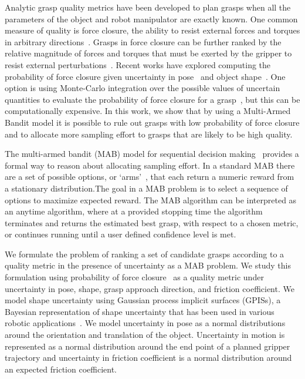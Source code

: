 \documentclass[a4paper, 10pt, conference]{ieeeconf}      %
\begin{document}
Analytic grasp quality metrics have been developed to plan grasps when all the parameters of the object and robot manipulator are exactly known.
One common measure of quality is force closure, the ability to resist external forces and torques in arbitrary directions~\cite{li1988task}.
Grasps in force closure can be further ranked by the relative magnitude of forces and torques that must be exerted by the gripper to resist external perturbations~\cite{ferrari1992}.
Recent works have explored computing the probability of  force closure given uncertainty in pose~\cite{christopoulos2007handling, kim2012physically, weisz2012pose} and object shape~\cite{kehoe2012estimating, mahler2015gp}.
One option is using Monte-Carlo integration over the possible values of uncertain quantities to evaluate the probability of force closure for a grasp~\cite{christopoulos2007handling, kim2012physically, weisz2012pose, kehoe2012estimating, kehoe2012toward}, but this can be computationally expensive.
In this work, we show that by using a Multi-Armed Bandit model it is possible to rule out grasps with low probability of force closure and to allocate more sampling effort to grasps that are likely to be high quality.

The multi-armed bandit (MAB) model for sequential decision making~\cite{barto1998reinforcement, lai1985asymptotically, robbins1985some} provides a formal way to reason about allocating sampling effort. In a standard MAB there are a set of possible options, or `arms'~\cite{barto1998reinforcement}, that each return a numeric reward from a stationary distribution.The goal in a MAB problem is to  select a sequence of options to maximize expected reward. The MAB algorithm can be interpreted as an anytime algorithm, where at a provided stopping time the algorithm terminates and returns the estimated best grasp, with respect to a chosen metric, or continues running until a user defined confidence level is met. 

We formulate the problem of ranking a set of candidate grasps according to a quality metric in the presence of uncertainty as a MAB problem.
We study this formulation using probability of force closure~\cite{christopoulos2007handling, weisz2012pose, kehoe2012toward} as a quality metric under uncertainty in pose, shape, grasp approach direction, and friction coefficient. 
We model shape uncertainty using Gaussian process implicit surfaces (GPISs), a Bayesian representation of shape uncertainty that has been used in various robotic applications~\cite{dragiev2011, hollinger2013}. 
We model uncertainty in pose as a normal distributions around the orientation and translation of the object.
Uncertainty in motion is represented as a normal distribution around the end point of a planned gripper trajectory and uncertainty in friction coefficient is a normal distribution around an expected friction coefficient.
\end{document}
